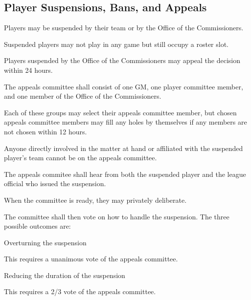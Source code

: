 \subsection{Player Suspensions, Bans, and Appeals}
\begin{deepEnumerate}
	\item Players may be suspended by their team or by the Office of the Commissioners.
	\begin{deepEnumerate}
		\item Suspended players may not play in any game but still occupy a roster slot.
	\end{deepEnumerate}
	\item Players suspended by the Office of the Commissioners may appeal the decision within 24 hours.
	\begin{deepEnumerate}
		\item The appeals committee shall consist of 
		one GM, one player committee member, and one member of the Office of the Commissioners.
		\begin{deepEnumerate}
			\item Each of these groups may select their appeals committee member, but chosen appeals committee members may fill any holes by themselves
			if any members are not chosen within 12 hours.
			\item Anyone directly involved in the matter at hand or affiliated with the suspended player's team	cannot be on the appeals committee.
		\end{deepEnumerate}
		\item The appeals commitee shall hear from both the suspended player and the league official who issued the suspension.
		\item When the committee is ready, they may privately deliberate.
		\item The committee shall then vote on how to handle the suspension. The three possible outcomes are:
		\begin{deepEnumerate}
			\item Overturning the suspension
			\begin{deepEnumerate}
				\item This requires a unanimous vote of the appeals committee.
			\end{deepEnumerate}
			\item Reducing the duration of the suspension
			\begin{deepEnumerate}
				\item This requires a 2/3 vote of the appeals committee.

\end{deepEnumerate}
\end{deepEnumerate}
\end{deepEnumerate}
\end{deepEnumerate}
